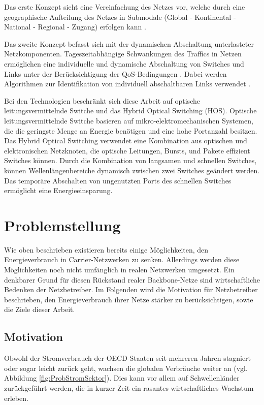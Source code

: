 \documentclass[12pt,titlepage]{article}
\begin{document}
Das erste Konzept sieht eine Vereinfachung des Netzes vor, welche durch eine geographische Aufteilung des Netzes in Submodale (Global - Kontinental - National - Regional - Zugang) erfolgen kann \cite{aleksic2014}.

Das zweite Konzept befasst sich mit der dynamischen Abschaltung unterlasteter Netzkomponenten. Tageszeitabhängige Schwankungen des Traffics in Netzen ermöglichen eine individuelle und dynamische Abschaltung von Switches und Links unter der Be\-rück\-sich\-ti\-gung der QoS-Bedingungen \cite{aleksic2013}. Dabei werden Algorithmen zur Identifikation von individuell abschaltbaren Links verwendet \cite{fisher}.

Bei den Technologien beschränkt sich diese Arbeit auf optische leitungsvermittelnde Switche und das Hybrid Optical Switching (HOS). Optische leitungsvermittelnde Switche basieren auf mikro-elektromechanischen Systemen, die die geringste Menge an Energie benötigen und eine hohe Portanzahl besitzen. Das Hybrid Optical Switching verwendet eine Kombination aus optischen und elektronischen Netzknoten, die optische Leitungen, Bursts, und Pakete effizient Switches können. Durch die Kombination von langsamen und schnellen Switches, können Wellenlängenbereiche dynamisch zwischen zwei Switches geändert werden. Das temporäre Abschalten von ungenutzten Ports des schnellen Switches ermöglicht eine Energieeinsparung.  \cite{aleksic2013}

\section{Problemstellung}
Wie oben beschrieben existieren bereits einige Möglichkeiten, den Energieverbrauch in Carrier-Netzwerken zu senken. Allerdings werden diese Möglichkeiten noch nicht umfänglich in realen Netzwerken umgesetzt. Ein denkbarer Grund für diesen Rückstand realer Backbone-Netze sind wirtschaftliche Bedenken der Netzbetreiber. Im Folgenden wird die Motivation für Netzbetreiber beschrieben, den Energieverbrauch ihrer Netze stärker zu berücksichtigen, sowie die Ziele dieser Arbeit.

\subsection{Motivation}
Obwohl der Stromverbrauch der OECD-Staaten seit mehreren Jahren stagniert oder sogar leicht zurück geht, wachsen die globalen Verbräuche weiter an (vgl. Abbildung \ref{fig:ProbStromSektor}). Dies kann vor allem auf  Schwellenländer zurückgeführt werden, die in kurzer Zeit ein rasantes wirtschaftliches Wachstum erleben.
\end{document}
